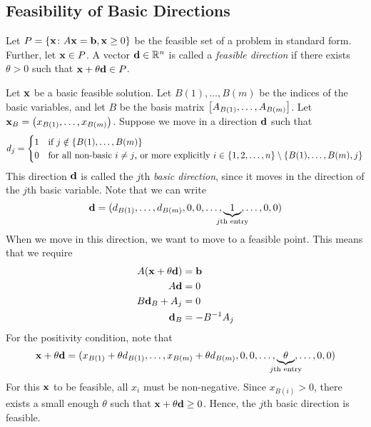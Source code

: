 \subsection{Feasibility of Basic Directions}
\begin{definition}
    Let \( P = \qty{\vb x \colon A \vb x = \vb b, \vb x \geq 0} \) be the feasible set of a problem in standard form.
    Further, let \( \vb x \in P \).
    A vector \( \vb d \in \mathbb R^n \) is called a \textit{feasible direction} if there exists \( \theta > 0 \) such that \( \vb x + \theta \vb d \in P \).
\end{definition}
Let \( \vb x \) be a basic feasible solution. Let \( B(1), \dots, B(m) \) be the indices of the basic variables, and let \( B \) be the basis matrix \( \qty[A_{B(1)}, \dots, A_{B(m)}] \).
Let \( \vb x_B = \qty(x_{B(1)}, \dots, x_{B(m)}) \).
Suppose we move in a direction \( \vb d \) such that
\[ d_j = \begin{cases}
    1 & \text{if } j \notin \qty{B(1), \dots, B(m)} \\
    0 & \text{for all non-basic } i \neq j \text{, or more explicitly } i \in \qty{1,2,\dots,n}\setminus\qty{B(1),\dots,B(m),j} \\
\end{cases} \]
This direction \( \vb d \) is called the \( j \)th \textit{basic direction}, since it moves in the direction of the \( j \)th basic variable.
Note that we can write
\[ \vb d = (d_{B(1)}, \dots, d_{B(m)}, 0, 0, \dots, \underbrace{1}_{\mathclap{j\text{th entry}}}, \dots, 0, 0) \]
When we move in this direction, we want to move to a feasible point. This means that we require
\begin{align*}
    A(\vb x + \theta \vb d) &= \vb b \\
    A\vb d &= 0 \\
    B\vb d_B + A_j &= 0 \\
    \vb d_B  &= -B^{-1}A_j
\end{align*}
For the positivity condition, note that
\[ \vb x + \theta \vb d = (x_{B(1)}+\theta d_{B(1)}, \dots, x_{B(m)}+\theta d_{B(m)}, 0, 0, \dots, \underbrace{\theta}_{\mathclap{j\text{th entry}}}, \dots, 0, 0) \]
For this \( \vb x \) to be feasible, all \( x_i \) must be non-negative.
Since \( x_{B(i)} > 0 \), there exists a small enough \( \theta \) such that \( \vb x + \theta \vb d \geq 0 \).
Hence, the \( j \)th basic direction is feasible.

